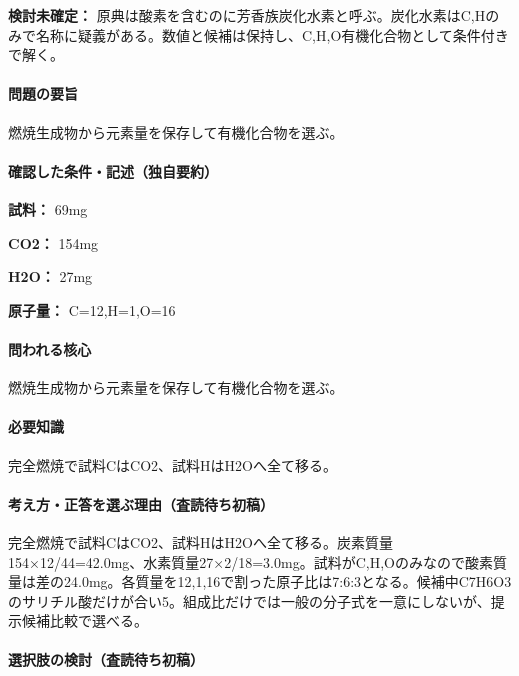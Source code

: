\par\textbf{検討未確定：} 原典は酸素を含むのに芳香族炭化水素と呼ぶ。炭化水素はC,Hのみで名称に疑義がある。数値と候補は保持し、C,H,O有機化合物として条件付きで解く。

\paragraph{問題の要旨} 燃焼生成物から元素量を保存して有機化合物を選ぶ。

\paragraph{確認した条件・記述（独自要約）}\mbox{}\par

\noindent\textbf{試料：} 69mg\par

\noindent\textbf{CO2：} 154mg\par

\noindent\textbf{H2O：} 27mg\par

\noindent\textbf{原子量：} C=\allowbreak{}12,H=\allowbreak{}1,O=\allowbreak{}16\par

\paragraph{問われる核心} 燃焼生成物から元素量を保存して有機化合物を選ぶ。

\paragraph{必要知識} 完全燃焼で試料CはCO2、試料HはH2Oへ全て移る。

\paragraph{考え方・正答を選ぶ理由（査読待ち初稿）} 完全燃焼で試料CはCO2、試料HはH2Oへ全て移る。炭素質量154×12/44=\allowbreak{}42.0mg、水素質量27×2/18=\allowbreak{}3.0mg。試料がC,H,Oのみなので酸素質量は差の24.0mg。各質量を12,1,16で割った原子比は7:6:3となる。候補中C7H6O3のサリチル酸だけが合い5。組成比だけでは一般の分子式を一意にしないが、提示候補比較で選べる。

\paragraph{選択肢の検討（査読待ち初稿）}\mbox{}\par

